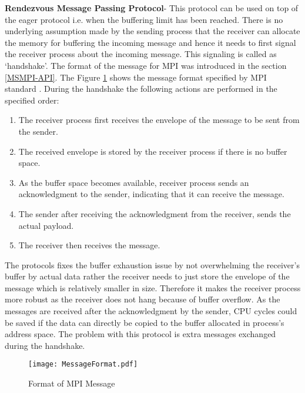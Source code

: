 \textbf{Rendezvous Message Passing Protocol}- This protocol can be used on top of the eager protocol i.e. when the buffering limit has been reached. There is no underlying assumption made by the sending process that the receiver can allocate the memory for buffering the incoming message and hence it needs to first signal the receiver process about the incoming message. This signaling is called as {\lq}handshake{\rq}. The format of the message for MPI was introduced in the  section \ref{MSMPI-API}. The Figure \ref{fig:MessageFormat} shows the message format specified by MPI standard \cite{mpiMsgForm}. During the handshake the following actions are performed in the specified order: 

\begin{enumerate}
\item The receiver process first receives the envelope of the message to be sent from the sender.
\item The received envelope is stored by the receiver process if there is no buffer space. 
\item As the buffer space becomes available, receiver process sends an acknowledgment to the sender, indicating that it can receive the message.
\item The sender after receiving the acknowledgment from the receiver, sends the actual payload. 
\item The receiver then receives the message. 
\end{enumerate}   

The protocols fixes the buffer exhaustion issue by not overwhelming the receiver's buffer by actual data rather the receiver needs to just store the envelope of the message which is relatively smaller in size. Therefore it makes the receiver process more robust as the receiver does not hang because of buffer overflow. As the messages are received after the acknowledgment by the sender, CPU cycles could be saved if the data can directly be copied to the buffer allocated in process's address space. The problem with this protocol is extra messages exchanged during the handshake. 

\begin{figure}[ht!]
\centering
\texttt{[image: MessageFormat.pdf]}
\caption{Format of MPI Message}
\label{fig:MessageFormat}
\end{figure}

